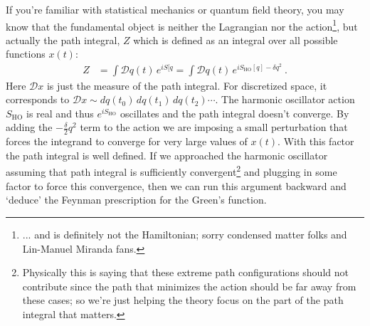 If you're familiar with statistical mechanics or quantum field theory, you may know that the fundamental object is neither the Lagrangian nor the action\footnote{... and is definitely not the Hamiltonian; sorry condensed matter folks and Lin-Manuel Miranda fans.}, but actually the path integral, $Z$ which is defined as an integral over all possible functions $x(t)$:
\begin{align}
	Z &= 
	\int \mathcal Dq(t) \, e^{iS[q}
	= 
	\int \mathcal Dq(t) \, e^{iS_\text{HO}[q] - \delta q^2} \ .
\end{align}
Here $\mathcal Dx$ is just the measure of the path integral. For discretized space, it corresponds to $\mathcal Dx\sim dq(t_0)\,dq(t_1)\, dq(t_2)\cdots$. The harmonic oscillator action $S_\text{HO}$ is real and thus $e^{iS_\text{HO}}$ oscillates and the path integral doesn't converge. By adding the $- \frac{\delta}{2} q^2$ term to the action we are imposing a small perturbation that forces the integrand to converge for very large values of $x(t)$. With this factor the path integral is well defined. If we approached the harmonic oscillator assuming that path integral is sufficiently convergent\footnote{Physically this is saying that these extreme path configurations should not contribute since the path that minimizes the action should be far away from these cases; so we're just helping the theory focus on the part of the path integral that matters.} and plugging in some factor to force this convergence, then we can run this argument backward and `deduce' the Feynman prescription for the Green's function.

